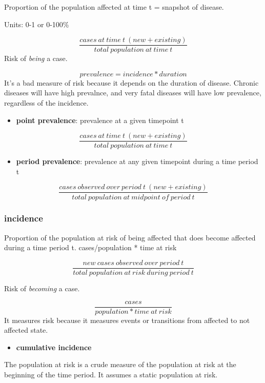 \documentclass[
]{article}
\providecommand{\tightlist}{%
  \setlength{\itemsep}{0pt}\setlength{\parskip}{0pt}}
\begin{document}
Proportion of the population affected at time t = snapshot of disease.

Units: 0-1 or 0-100\%

\[\frac{cases\:at\:time\:t\:(new + existing)}{total\:population\:at\:time\:t}\]
Risk of \emph{being} a case.

\[prevalence = incidence * duration\] It's a bad measure of risk because
it depends on the duration of disease. Chronic diseases will have high
prevalnce, and very fatal diseases will have low prevalence, regardless
of the incidence.

\begin{itemize}
\tightlist
\item
  \textbf{point prevalence}: prevalence at a given timepoint t
\end{itemize}

\[\frac{cases\:at\:time\:t\:(new + existing)}{total\:population\:at\:time\:t}\]

\begin{itemize}
\tightlist
\item
  \textbf{period prevalence}: prevalence at any given timepoint during a
  time period t
\end{itemize}

\[\frac{cases\:observed\:over\:period\:t\:(new + existing)}{total\:population\:at\:midpoint\:of\:period\:t}\]

\hypertarget{incidence}{%
\subsubsection{incidence}\label{incidence}}

Proportion of the population at risk of being affected that does become
affected during a time period t. cases/population * time at risk

\[\frac{new\:cases\:observed\:over\:period\:t}{total\:population\:at\:risk\:during\:period\:t}\]

Risk of \emph{becoming} a case.

\[\frac{cases}{population*time\:at\:risk}\] It measures risk because it
measures events or transitions from affected to not affected state.

\begin{itemize}
\tightlist
\item
  \textbf{cumulative incidence}
\end{itemize}

The population at risk is a crude measure of the population at risk at
the beginning of the time period. It assumes a static population at
risk.
\end{document}
